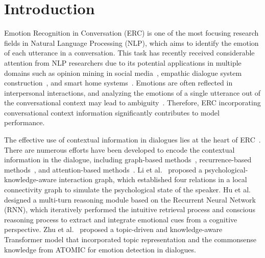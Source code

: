 \documentclass{SCIS2019}
\begin{document}

\maketitle


\section{Introduction}
Emotion Recognition in Conversation (ERC) is one of the most focusing research fields in Natural Language Processing (NLP), which aims to identify the emotion of each utterance in a conversation. This task has recently received considerable attention from NLP researchers due to its potential applications in multiple domains such as opinion mining in social media~\cite{8267597,habimana2020sentiment}, empathic dialogue system construction~\cite{majumder2019dialoguernn, lin2019moel}, and smart home systems~\cite{young2018augmenting,khan2022human}. Emotions are often reflected in interpersonal interactions, and analyzing the emotions of a single utterance out of the conversational context may lead to ambiguity~\cite{zhou2018emotional}. Therefore, ERC incorporating conversational context information significantly contributes to model performance. 

The effective use of contextual information in dialogues lies at the heart of ERC~\cite{poria2019emotion}. There are numerous efforts have been developed to encode the contextual information in the dialogue, including graph-based methods~\cite{ghosal2019dialoguegcn,shen-etal-2021-directed,li2022graphcfc}, recurrence-based methods~\cite{majumder2019dialoguernn, jiao2019higru,Ghosal2020}, and attention-based methods~\cite{zhong2019knowledge,zhu2021kat,li2022ga2mif}. Li et al.~\cite{li2021past} proposed a psychological-knowledge-aware interaction graph, which established four relations in a local connectivity graph to simulate the psychological state of the speaker. Hu et al.~\cite{hu2021dialoguecrn} designed a multi-turn reasoning module based on the Recurrent Neural Network (RNN), which iteratively performed the intuitive retrieval process and conscious reasoning process to extract and integrate emotional cues from a cognitive perspective. Zhu et al.~\cite{zhu2021kat} proposed a topic-driven and knowledge-aware Transformer model that incorporated topic representation and the commonsense knowledge from ATOMIC for emotion detection in dialogues. 
\end{document}
